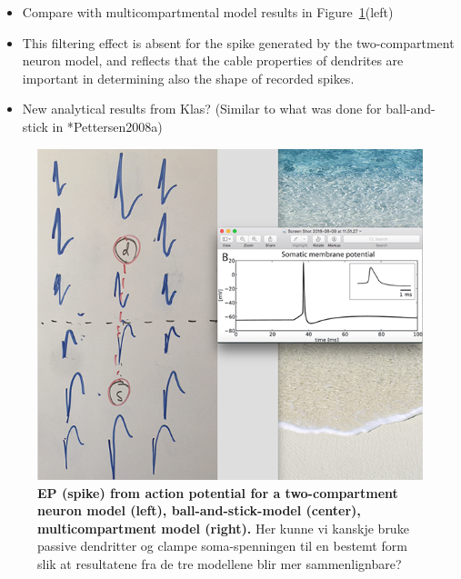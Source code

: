 \begin{itemize}
\item Compare with multicompartmental model results in Figure~\ref{Spikes:fig:DifferentNeuronModels}(left)
\item This filtering effect is absent for the spike generated by the two-compartment neuron model, 
and reflects that the cable properties of dendrites are important in determining 
also the shape of recorded spikes.   
\item New analytical results from Klas? (Similar to what was done for ball-and-stick in \citeasnoun**{Pettersen2008a}) 
\end{itemize}


\begin{figure}[!ht]
\begin{center}
\includegraphics{Figures/Spikes/Spikes-TwoCompartment-w100-r150}
\end{center}
\caption{\textbf{EP (spike) from action potential for a two-compartment neuron model (left), ball-and-stick-model (center),
multicompartment model (right).}
Her kunne vi kanskje bruke passive dendritter og clampe soma-spenningen til en bestemt form slik at resultatene fra de
tre modellene blir mer sammenlignbare?
}
\label{Spikes:fig:DifferentNeuronModels}
\end{figure}

